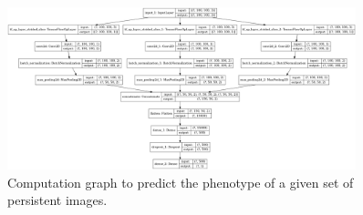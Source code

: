 \documentclass{article}
\begin{document}
\begin{figure}
  \centering
  \includegraphics[width=0.9\textwidth]{figures/model.png}
  \caption{Computation graph to predict the phenotype of a given set of persistent images.}
  \label{fig:model_arch}
\end{figure}
\end{document}
